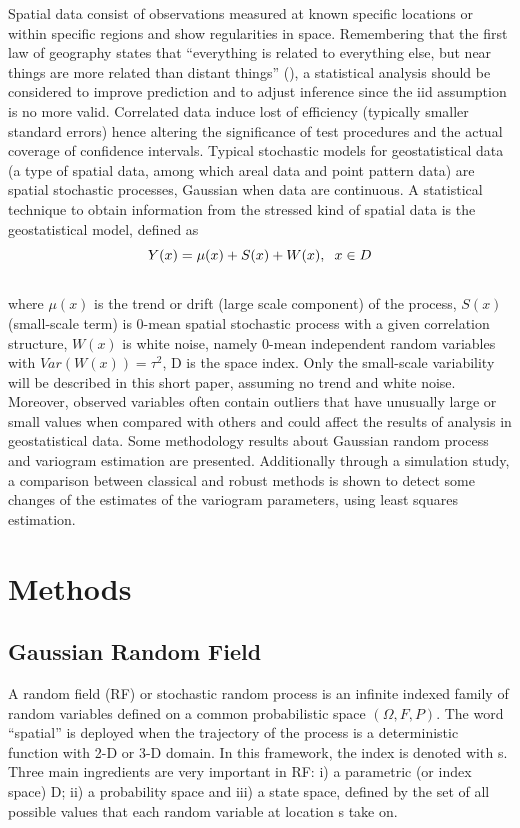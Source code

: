\documentclass[
  12pt]{article}
\begin{document}
Spatial data consist of observations measured at known specific
locations or within specific regions and show regularities in space.
Remembering that the first law of geography states that ``everything is
related to everything else, but near things are more related than
distant things'' (\citet{tob:1969}), a statistical analysis should be
considered to improve prediction and to adjust inference since the iid
assumption is no more valid. Correlated data induce lost of efficiency
(typically smaller standard errors) hence altering the significance of
test procedures and the actual coverage of confidence intervals. Typical
stochastic models for geostatistical data (a type of spatial data, among
which areal data and point pattern data) are spatial stochastic
processes, Gaussian when data are continuous. A statistical technique to
obtain information from the stressed kind of spatial data is the
geostatistical model, defined as\\
\[Y(x)=\mu(x)+S(x)+W(x), \hspace{2mm} x\in D\]\\
where \(\mu(x)\) is the trend or drift (large scale component) of the
process, \(S(x)\) (small-scale term) is 0-mean spatial stochastic
process with a given correlation structure, \(W(x)\) is white noise,
namely 0-mean independent random variables with \(Var(W(x))=\tau^2\), D
is the space index. Only the small-scale variability will be described
in this short paper, assuming no trend and white noise. Moreover,
observed variables often contain outliers that have unusually large or
small values when compared with others and could affect the results of
analysis in geostatistical data. Some methodology results about Gaussian
random process and variogram estimation are presented. Additionally
through a simulation study, a comparison between classical and robust
methods is shown to detect some changes of the estimates of the
variogram parameters, using least squares estimation.

\section{Methods}\label{methods}

\subsection{Gaussian Random Field}\label{gaussian-random-field}

A random field (RF) or stochastic random process is an infinite indexed
family of random variables defined on a common probabilistic space
\((\Omega,F,P)\). The word ``spatial'' is deployed when the trajectory
of the process is a deterministic function with 2-D or 3-D domain. In
this framework, the index is denoted with s. Three main ingredients are
very important in RF: i) a parametric (or index space) D; ii) a
probability space and iii) a state space, defined by the set of all
possible values that each random variable at location s take on.
\end{document}
